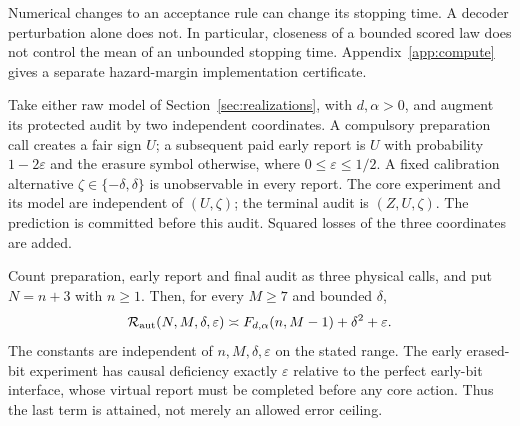 Numerical changes to an acceptance rule can change its stopping time. A decoder perturbation alone does not. In particular, closeness of a bounded scored law does not control the mean of an unbounded stopping time. Appendix~\ref{app:compute} gives a separate hazard-margin implementation certificate.

\begin{theorem}\label{thm:joint}
Take either raw model of Section~\ref{sec:realizations}, with $d,\alpha>0$, and augment its protected audit by two independent coordinates. A compulsory preparation call creates a fair sign $U$; a subsequent paid early report is $U$ with probability $1-2\varepsilon$ and the erasure symbol otherwise, where $0\le\varepsilon\le1/2$. A fixed calibration alternative $\zeta\in\{-\delta,\delta\}$ is unobservable in every report. The core experiment and its model are independent of $(U,\zeta)$; the terminal audit is $(Z,U,\zeta)$. The prediction is committed before this audit. Squared losses of the three coordinates are added.

Count preparation, early report and final audit as three physical calls, and put $N=n+3$ with $n\ge1$. Then, for every $M\ge7$ and bounded $\delta$,
\begin{equation}\label{eq:joint-law}
 \mathcal R_{\rm aut}(N,M,\delta,\varepsilon)
 \asymp F_{d,\alpha}(n,M-1)+\delta^2+\varepsilon.
\end{equation}
The constants are independent of $n,M,\delta,\varepsilon$ on the stated range. The early erased-bit experiment has causal deficiency exactly $\varepsilon$ relative to the perfect early-bit interface, whose virtual report must be completed before any core action. Thus the last term is attained, not merely an allowed error ceiling.
\end{theorem}
